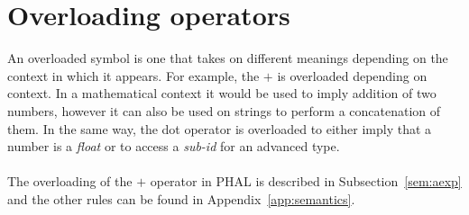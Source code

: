 \section{Overloading operators}
An overloaded symbol is one that takes on different meanings depending on the context in which it appears. 
For example, the $+$ is overloaded depending on context. In a mathematical context it would be used to imply addition of two numbers, however it can also be used on strings to perform a concatenation of them. In the same way, the dot operator is overloaded to either imply that a number is a \textit{float} or to access a \textit{sub-id} for an advanced type.
\\\\
The overloading of the $+$ operator in PHAL is described in Subsection~\ref{sem:aexp} and the other rules can be found in Appendix~\ref{app:semantics}.